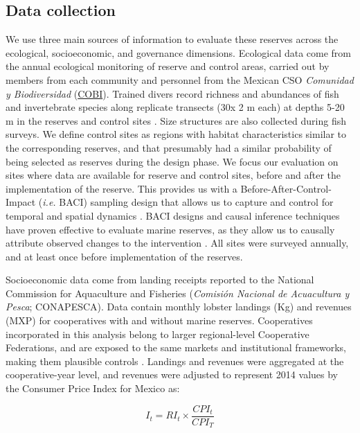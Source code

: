 \documentclass{frontiersSCNS}
\theoremstyle{definition}
\theoremstyle{definition}
\theoremstyle{definition}
\theoremstyle{remark}
\begin{document}
\subsection{Data collection}\label{data-collection}

We use three main sources of information to evaluate these reserves
across the ecological, socioeconomic, and governance dimensions.
Ecological data come from the annual ecological monitoring of reserve
and control areas, carried out by members from each community and
personnel from the Mexican CSO \emph{Comunidad y Biodiversidad}
(\href{www.cobi.org.mx}{COBI}). Trained divers record richness and
abundances of fish and invertebrate species along replicate transects
(30x 2 m each) at depths 5-20 m in the reserves and control sites
\citep{fulton_2018,fulton_2019}. Size structures are also collected
during fish surveys. We define control sites as regions with habitat
characteristics similar to the corresponding reserves, and that
presumably had a similar probability of being selected as reserves
during the design phase. We focus our evaluation on sites where data are
available for reserve and control sites, before and after the
implementation of the reserve. This provides us with a
Before-After-Control-Impact (\emph{i.e.} BACI) sampling design that
allows us to capture and control for temporal and spatial dynamics
\citep{depalma_2018,ferraro_2006-oW}. BACI designs and causal inference
techniques have proven effective to evaluate marine reserves, as they
allow us to causally attribute observed changes to the intervention
\citep{moland_2013-VP,Villasenor-Derbez_2018}. All sites were surveyed
annually, and at least once before implementation of the reserves.

Socioeconomic data come from landing receipts reported to the National
Commission for Aquaculture and Fisheries (\emph{Comisión Nacional de
Acuacultura y Pesca}; CONAPESCA). Data contain monthly lobster landings
(Kg) and revenues (MXP) for cooperatives with and without marine
reserves. Cooperatives incorporated in this analysis belong to larger
regional-level Cooperative Federations, and are exposed to the same
markets and institutional frameworks, making them plausible controls
\citep{mccay_2017-1m,ayer_2018}. Landings and revenues were aggregated
at the cooperative-year level, and revenues were adjusted to represent
2014 values by the Consumer Price Index for Mexico \citep{oecd_2017-VV}
as:

\begin{equation}
I_t = RI_t\times\frac{CPI_t}{CPI_T}
\label{eqn:cpi}
\end{equation}
\end{document}
